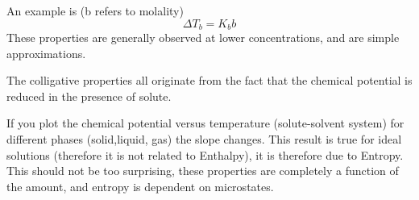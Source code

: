 \documentclass{article}
\newcommand{\be}{\begin{equation}}
\newcommand{\ee}{\end{equation}}
\begin{document}
An example is (b refers to molality)
\be
\Delta T_b = K_b b
\ee
These properties are generally observed at lower concentrations, and are simple approximations. 

The colligative properties all originate from the fact that the chemical potential is reduced in the presence of solute. 

If you plot the chemical potential versus temperature (solute-solvent system) for different phases (solid,liquid, gas) the slope changes.
This result is true for ideal solutions (therefore it is not related to Enthalpy), it is therefore due to Entropy.
This should not be too surprising, these properties are completely a function of the amount, and entropy is dependent on microstates. 
\end{document}
